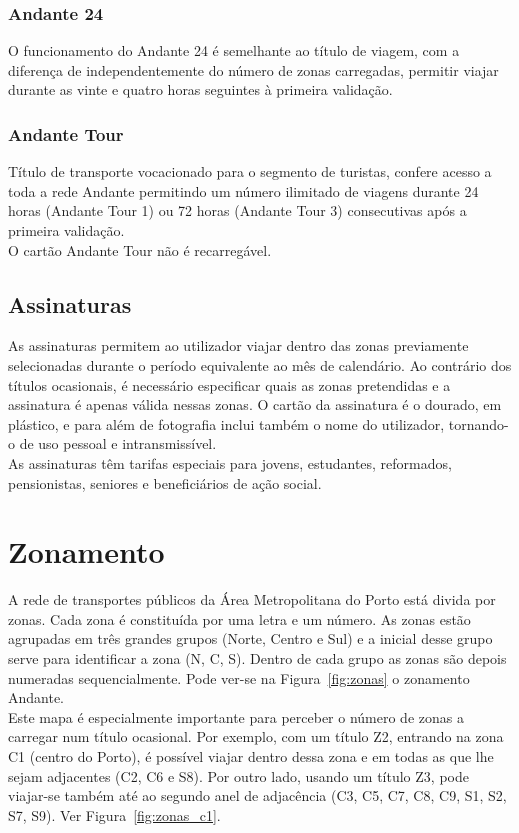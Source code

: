 \subsubsection{Andante 24}

O funcionamento do Andante 24 é semelhante ao título de viagem, com a diferença de independentemente do número de zonas carregadas, permitir viajar durante as vinte e quatro horas seguintes à primeira validação.

\subsubsection{Andante Tour}

Título de transporte vocacionado para o segmento de turistas, confere acesso a toda a rede Andante permitindo um número ilimitado de viagens durante 24 horas (Andante Tour 1) ou 72 horas (Andante Tour 3) consecutivas após a primeira validação.
\\O cartão Andante Tour não é recarregável.


\subsection{Assinaturas}

As assinaturas permitem ao utilizador viajar dentro das zonas previamente selecionadas durante o período equivalente ao mês de calendário. Ao contrário dos títulos ocasionais, é necessário especificar quais as zonas pretendidas e a assinatura é apenas válida nessas zonas. O cartão da assinatura é o dourado, em plástico, e para além de fotografia inclui também o nome do utilizador, tornando-o de uso pessoal e intransmissível.
\\As assinaturas têm tarifas especiais para jovens, estudantes, reformados, pensionistas, seniores e beneficiários de ação social.

\section{Zonamento}

A rede de transportes públicos da Área Metropolitana do Porto está divida por zonas. Cada zona é constituída por uma letra e um número. As zonas estão agrupadas em três grandes grupos (Norte, Centro e Sul) e a inicial desse grupo serve para identificar a zona (N, C, S). Dentro de cada grupo as zonas são depois numeradas sequencialmente. Pode ver-se na Figura~\ref{fig:zonas} o zonamento Andante.
\\Este mapa é especialmente importante para perceber o número de zonas a carregar num título ocasional. Por exemplo, com um título Z2, entrando na zona C1 (centro do Porto), é possível viajar dentro dessa zona e em todas as que lhe sejam adjacentes (C2, C6 e S8). Por outro lado, usando um título Z3, pode viajar-se também até ao segundo anel de adjacência (C3, C5, C7, C8, C9, S1, S2, S7, S9). Ver Figura~\ref{fig:zonas_c1}.

